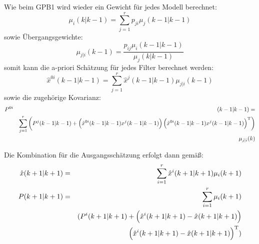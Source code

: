 Wie beim GPB1 wird wieder ein Gewicht für jedes Modell berechnet:
\begin{equation*}
    \mu_i (k|k-1) = \sum_{j=1}^r p_{ji} \mu_j(k-1|k-1)
\end{equation*}
sowie Übergangsgewichte:
\begin{equation*}
    \mu_{j|i}(k-1) = \frac{p_{ij} \mu_i(k-1|k-1)}{\mu_j(k|k-1)}
\end{equation*}
somit kann die a-priori Schätzung für jedes Filter berechnet werden:
\begin{equation*}
    \hat{x}^{0i} (k-1|k-1) = \sum_{j=1}^r \hat{x}^j (k-1|k-1) \mu_{j|i}(k-1)
\end{equation*}
sowie die zugehörige Kovarianz:
\begin{eqnarray*}
    P^{0i}&&(k-1|k-1) = \\
    &&\sum_{j=1}^r \left(P^j(k-1|k-1) + 
    \left(\hat{x}^{0i}(k-1|k-1) x^j(k-1|k-1)\right)
    \left(\hat{x}^{0i}(k-1|k-1) x^j(k-1|k-1)\right)^\text{T} \right) \\
    &&\mu_{j|i}(k)
\end{eqnarray*}

Die Kombination für die Ausgangsschätzung erfolgt dann gemäß:
\begin{eqnarray*}
    \hat{x}(k+1|k+1) &=& \sum_{i=1}^r \hat{x}^i(k+1|k+1)\mu_i(k+1) \\
    P(k+1|k+1) &=& \sum_{i=1}^r \mu_i(k+1) \\
        && (P^i(k+1|k+1) + \left(\hat{x}^i(k+1|k+1) - \hat{x}(k+1|k+1)\right) \\
        && \left(\hat{x}^i(k+1|k+1) - \hat{x}(k+1|k+1)\right)^\text{T} )
\end{eqnarray*}
